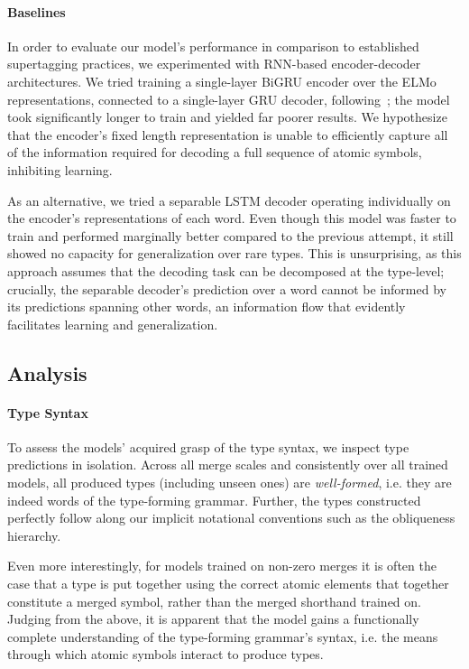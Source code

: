 \paragraph{Baselines}
In order to evaluate our model's performance in comparison to established supertagging practices, we experimented with RNN-based encoder-decoder architectures. 
We tried training a single-layer BiGRU encoder over the ELMo representations, connected to a single-layer GRU decoder, following~\cite{encdec}; the model took significantly longer to train and yielded far poorer results.
We hypothesize that the encoder's fixed length representation is unable to efficiently capture all of the information required for decoding a full sequence of atomic symbols, inhibiting learning.

As an alternative, we tried a separable LSTM decoder operating individually on the encoder's representations of each word. 
Even though this model was faster to train and performed marginally better compared to the previous attempt, it still showed no capacity for generalization over rare types. 
This is unsurprising, as this approach assumes that the decoding task can be decomposed at the type-level; crucially, the separable decoder's prediction over a word cannot be informed by its predictions spanning other words, an information flow that evidently facilitates learning and generalization.

\subsection{Analysis}
\paragraph{Type Syntax}
To assess the models' acquired grasp of the type syntax, we inspect type predictions in isolation.
Across all merge scales and consistently over all trained models, all produced types (including unseen ones) are \textit{well-formed}, i.e. they are indeed words of the type-forming grammar.
Further, the types constructed perfectly follow along our implicit notational conventions such as the obliqueness hierarchy.

Even more interestingly, for models trained on non-zero merges it is often the case that a type is put together using the correct atomic elements that together constitute a merged symbol, rather than the merged shorthand trained on.
Judging from the above, it is apparent that the model gains a functionally complete understanding of the type-forming grammar's syntax, i.e. the means through which atomic symbols interact to produce types.

